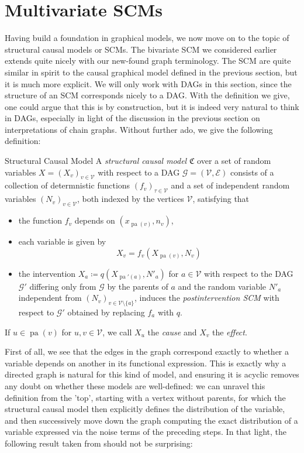 \documentclass[11pt, a4paper]{memoir}
\theoremstyle{break}
\theoremstyle{break}
\theoremstyle{nonumberplain}
\DeclareMathOperator{\pa}{pa}
\begin{document}
\section{Multivariate SCMs}
Having build a foundation in graphical models, we now move on to the topic of structural causal models or SCMs. The bivariate SCM we considered earlier extends quite nicely with our new-found graph terminology. The SCM are quite similar in spirit to the causal graphical model defined in the previous section, but it is much more explicit. We will only work with DAGs in this section, since the structure of an SCM corresponds nicely to a DAG. With the definition we give, one could argue that this is by construction, but it is indeed very natural to think in DAGs, especially in light of the discussion in the previous section on interpretations of chain graphs. Without further ado, we give the following definition:
\begin{mydefinition}{Structural Causal Model}
A \emph{structural causal model} $\mathfrak{C}$ over a set of random variables $X=(X_v)_{v\in \mathcal{V}}$ with respect to a DAG $\mathcal{G}=(\mathcal{V},\mathcal{E})$ consists of a collection of determnistic functions $(f_v)_{\tau\in \mathcal{V}}$ and a set of independent random variables $(N_v)_{v\in \mathcal{V}}$, both indexed by the vertices $\mathcal{V}$, satisfying that
\begin{itemize}
	\item the function $f_v$ depends on $\left(x_{\pa(v)}, n_v\right)$,
	\item each variable is given by
	$$X_v=f_v\left(X_{\pa(v)}, N_v\right)$$
	\item the intervention $X_a\coloneqq q\left(X_{\pa'(a)}, N'_a\right)$ for $a\in \mathcal{V}$ with respect to the DAG $\mathcal{G}'$ differing only from $\mathcal{G}$ by the parents of $a$ and the random variable $N'_a$ independent from $(N_v)_{v\in \mathcal{V}\setminus \{a\}}$, induces the \emph{postintervention SCM} with respect to $\mathcal{G}'$ obtained by replacing $f_a$ with $q$.
\end{itemize}
If $u\in \pa(v)$ for $u,v\in \mathcal{V}$, we call $X_u$ the \emph{cause} and $X_v$ the \emph{effect}. 
\end{mydefinition}
First of all, we see that the edges in the graph correspond exactly to whether a variable depends on another in its functional expression. This is exactly why a directed graph is natural for this kind of model, and ensuring it is acyclic removes any doubt on whether these models are well-defined: we can unravel this definition from the 'top', starting with a vertex without parents, for which the structural causal model then explicitly defines the distribution of the variable, and then successively move down the graph computing the exact distribution of a variable expressed via the noise terms of the preceding steps. In that light, the following result taken from \cite{Pearl} should not be surprising:
\end{document}
